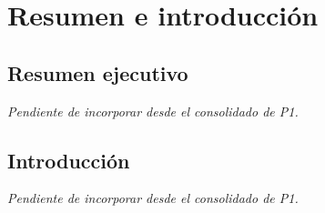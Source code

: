 \section{Resumen e introducción}

\subsection{Resumen ejecutivo}
\textit{Pendiente de incorporar desde el consolidado de P1.}

\subsection{Introducción}
\textit{Pendiente de incorporar desde el consolidado de P1.}
